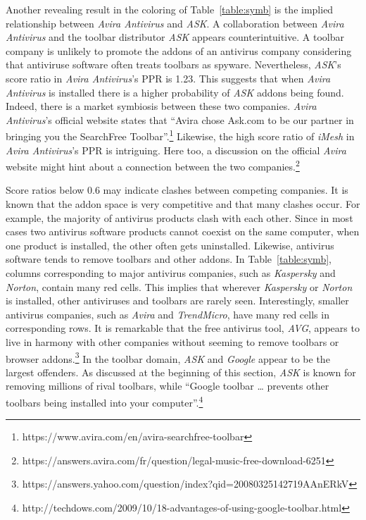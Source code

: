 \documentclass[10pt,letterpaper]{article}
\begin{document}
Another revealing result in the coloring of Table~\ref{table:symb} is the implied relationship between \textit{Avira Antivirus} and \textit{ASK}. A collaboration between \textit{Avira Antivirus} and the toolbar distributor \textit{ASK} appears counterintuitive. A toolbar company is unlikely to promote the addons of an antivirus company considering that antiviruse software often treats toolbars as spyware. Nevertheless, \textit{ASK}'s score ratio in \textit{Avira Antivirus}'s PPR is 1.23. This suggests that when \textit{Avira} \textit{Antivirus} is installed there is a higher probability of \textit{ASK} addons being found. Indeed, there is a market symbiosis between these two companies. \textit{Avira Antivirus}'s official website states that ``Avira chose Ask.com to be our partner in bringing you the SearchFree Toolbar''.\footnote{ https://www.avira.com/en/avira-searchfree-toolbar} Likewise, the high score ratio of \textit{iMesh} in \textit{Avira Antivirus}'s PPR is intriguing. Here too, a discussion on the official \textit{Avira} website might hint about a connection between the two companies.\footnote{ https://answers.avira.com/fr/question/legal-music-free-download-6251}

Score ratios below 0.6 may indicate clashes between competing companies. It is known that the addon space is very competitive and that many clashes occur. For example, the majority of antivirus products clash with each other. Since in most cases two antivirus software products cannot coexist on the same computer, when one product is installed, the other often gets uninstalled. Likewise, antivirus software tends to remove toolbars and other addons. In Table~\ref{table:symb}, columns corresponding to major antivirus companies, such as \textit{Kaspersky} and \textit{Norton}, contain many red cells. This implies that wherever \textit{Kaspersky} or \textit{Norton} is installed, other antiviruses and toolbars are rarely seen. Interestingly, smaller antivirus companies, such as \textit{Avira} and \textit{TrendMicro}, have many red cells in corresponding rows. It is remarkable that the free antivirus tool, \textit{AVG}, appears to live in harmony with other companies without seeming to remove toolbars or browser addons.\footnote{ https://answers.yahoo.com/question/index?qid=20080325142719AAnERkV} In the toolbar domain, \textit{ASK} and \textit{Google} appear to be the largest offenders. As discussed at the beginning of this section, \textit{ASK} is known for removing millions of rival toolbars, while ``Google toolbar {\dots} prevents other toolbars being installed into your computer''.\footnote{ http://techdows.com/2009/10/18-advantages-of-using-google-toolbar.html} 
\end{document}
